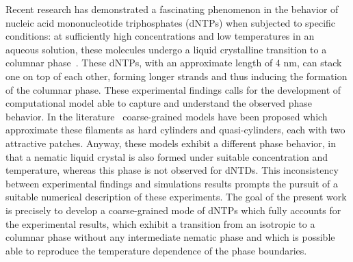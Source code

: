 \documentclass[aip,jcp, amsmath, amssymb, reprint]{revtex4-1}
\begin{document}
Recent research has demonstrated a fascinating phenomenon in the behavior of nucleic acid mononucleotide triphosphates
(dNTPs) when subjected to specific conditions: at sufficiently high concentrations and low temperatures in an aqueous
solution, these molecules undergo a liquid crystalline transition to a columnar phase~\cite{Smith}. 
These dNTPs, with an approximate length of 4 nm, can stack one on top of each other, forming longer strands and thus 
inducing the formation of the columnar phase. These experimental findings calls for 
the development of computational model able to capture and understand the observed phase behavior.
In the literature~\cite{Nguyen,C0JM02355H,Bellini} 
coarse-grained models have been proposed which approximate these filaments as hard cylinders and quasi-cylinders, each with two
attractive patches. Anyway, these models exhibit a different phase behavior, in that a nematic liquid crystal is also formed
under suitable concentration and temperature, whereas this phase is not observed for dNTDs.
This inconsistency between experimental findings and simulations results prompts the
pursuit of a suitable numerical description of these experiments. 
The goal of the present work is precisely to develop a coarse-grained mode of dNTPs which fully accounts for the experimental 
results, which exhibit a transition from an isotropic to a columnar phase without any intermediate nematic phase and which is 
possible able to reproduce the temperature dependence of the phase boundaries.
\end{document}

